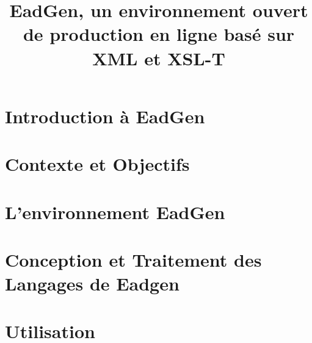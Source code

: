 \documentclass[twocolumn]{article}
\date{}
\title{EadGen, un environnement ouvert de production en ligne basé sur XML et XSL-T}
\begin{document}
\maketitle

\section{Introduction à EadGen}


\section{Contexte et Objectifs}


\section{L’environnement EadGen}


\section{Conception et Traitement des Langages de Eadgen}


\section{Utilisation}

\end{document}
